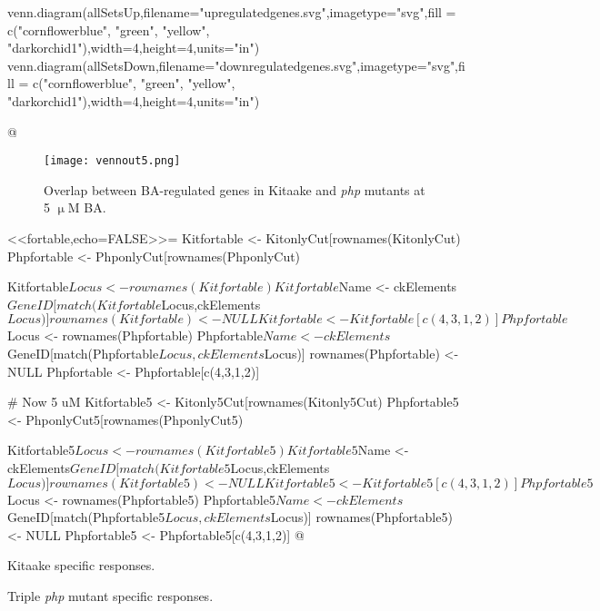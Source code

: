 \documentclass{article}
\begin{document}
{{{venn.diagram(allSetsUp,filename="upregulatedgenes.svg",imagetype="svg",fill = c("cornflowerblue", "green", "yellow", "darkorchid1"),width=4,height=4,units="in")
venn.diagram(allSetsDown,filename="downregulatedgenes.svg",imagetype="svg",fill = c("cornflowerblue", "green", "yellow", "darkorchid1"),width=4,height=4,units="in")


@




\begin{figure}
	\centering{}
	\texttt{[image: vennout5.png]}
	\caption{Overlap between BA-regulated genes in Kitaake and \textit{php} mutants at 5 $\upmu{}$M BA.}
	\label{fig:squarevenn5}
\end{figure}

<<fortable,echo=FALSE>>=
Kitfortable <- KitonlyCut[rownames(KitonlyCut) %
Phpfortable <- PhponlyCut[rownames(PhponlyCut) %

Kitfortable$Locus <- rownames(Kitfortable)
Kitfortable$Name <- ckElements$GeneID[match(Kitfortable$Locus,ckElements$Locus)]
rownames(Kitfortable) <- NULL
Kitfortable <- Kitfortable[c(4,3,1,2)]

Phpfortable$Locus <- rownames(Phpfortable)
Phpfortable$Name <- ckElements$GeneID[match(Phpfortable$Locus,ckElements$Locus)]
rownames(Phpfortable) <- NULL
Phpfortable <- Phpfortable[c(4,3,1,2)]

# Now 5 uM
Kitfortable5 <- Kitonly5Cut[rownames(Kitonly5Cut) %
Phpfortable5 <- PhponlyCut5[rownames(PhponlyCut5) %

Kitfortable5$Locus <- rownames(Kitfortable5)
Kitfortable5$Name <- ckElements$GeneID[match(Kitfortable5$Locus,ckElements$Locus)]
rownames(Kitfortable5) <- NULL
Kitfortable5 <- Kitfortable5[c(4,3,1,2)]

Phpfortable5$Locus <- rownames(Phpfortable5)
Phpfortable5$Name <- ckElements$GeneID[match(Phpfortable5$Locus,ckElements$Locus)]
rownames(Phpfortable5) <- NULL
Phpfortable5 <- Phpfortable5[c(4,3,1,2)]
@

\begin{table}
	\begin{subtable}{.8\linewidth}
		\caption{Kitaake specific responses.}
		\label{tab:CK100A}
	\end{subtable}
	
	\begin{subtable}{.8\linewidth}
		\caption{Triple \textit{php} mutant specific responses.}
		\label{tab:CK100B}
	\end{subtable}


\end{table}}}}
\end{document}
